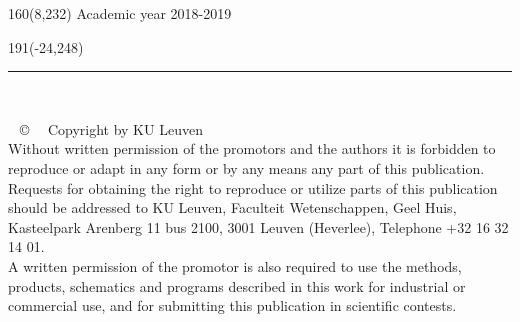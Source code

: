 %
\begin{textblock}{160}(8,232)
\textblockcolour{}
\vspace{-\parskip}
\flushright
Academic year 2018-2019
\end{textblock}
%
\begin{textblock}{191}(-24,248)
{\color{blueline}\rule{550pt}{5.5pt}}
\end{textblock}
%
\vfill

\afterpage{\blankpage}
~
\newpage

\afterpage{\blankpage}
\newpage
\thispagestyle{empty}
\addtocounter{page}{-1}
~
\vfill
\copyright $\quad$ Copyright by KU Leuven\\

Without written permission of the promotors and the authors it is forbidden to reproduce or adapt in any form or by any means any part of this publication. Requests for obtaining the right to reproduce or utilize parts of this publication should be addressed to KU Leuven, Faculteit Wetenschappen, Geel Huis, Kasteelpark Arenberg 11 bus 2100, 3001 Leuven (Heverlee), Telephone +32 16 32 14 01.\\

A written permission of the promotor is also required to use the methods, products, schematics and programs described in this work for industrial or commercial use, and for submitting this publication in scientific contests.
\newpage
\addtocounter{page}{-1}